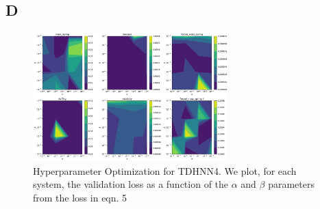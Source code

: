 \documentclass[twoside]{article}
\begin{document}
\subsection*{D}
\begin{figure}[!htb]
\centering
\includegraphics[width=.5\textwidth, height=5cm]{figures/forceanddampingregulariseroptimisation.pdf}
\caption{Hyperparameter Optimization for TDHNN4. We plot, for each system, the validation loss as a function of the $\alpha$ and $\beta$ parameters from the loss in eqn. 5}
\end{figure}
\end{document}
